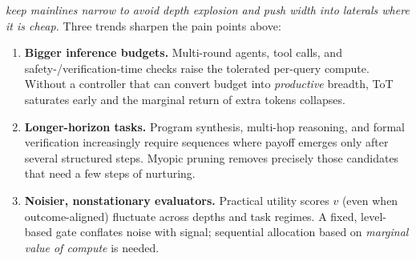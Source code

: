 \documentclass{article}
\begin{document}
\emph{keep mainlines narrow to avoid depth explosion and push width into laterals where it is cheap.}
Three trends sharpen the pain points above:
\begin{enumerate}[leftmargin=*, itemsep=2pt, topsep=2pt]
    \item \textbf{Bigger inference budgets.} Multi-round agents, tool calls, and safety-/verification-time checks raise the tolerated per-query compute. Without a controller that can convert budget into \emph{productive} breadth, ToT saturates early and the marginal return of extra tokens collapses.
    \item \textbf{Longer-horizon tasks.} Program synthesis, multi-hop reasoning, and formal verification increasingly require sequences where payoff emerges only after several structured steps. Myopic pruning removes precisely those candidates that need a few steps of nurturing.
    \item \textbf{Noisier, nonstationary evaluators.} Practical utility scores $v$ (even when outcome-aligned) fluctuate across depths and task regimes. A fixed, level-based gate conflates noise with signal; sequential allocation based on \emph{marginal value of compute} is needed.
\end{enumerate}
\end{document}

